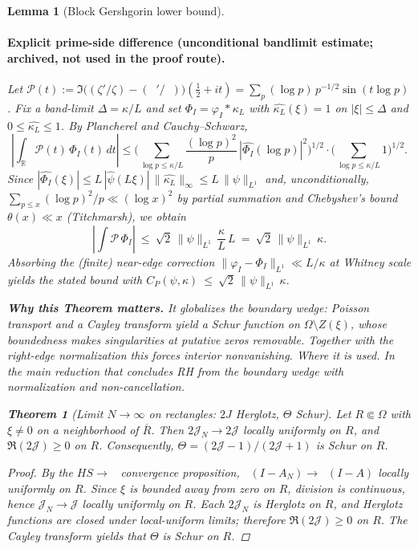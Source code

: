 \documentclass[11pt]{article}
\newtheorem{theorem}{Theorem}[section]
\newtheorem{lemma}{Lemma}[section]
\theoremstyle{definition}
\theoremstyle{remark}
\newcommand{\R}{\mathbb{R}}
\DeclareMathOperator{\dettwo}{det_2}
\begin{document}
\begin{lemma}[Block Gershgorin lower bound]
\vspace{1.0cm}
\paragraph{Explicit prime-side difference (unconditional bandlimit estimate; archived, not used in the proof route).}
Let $\mathcal P(t):=\Im\big((\zeta'/\zeta)-(\dettwo'/\dettwo)\big)(\tfrac12+it)=\sum_{p}(\log p)\,p^{-1/2}\sin(t\log p)$. Fix a band-limit $\Delta=\kappa/L$ and set $\Phi_I=\varphi_I*\kappa_L$ with $\widehat{\kappa_L}(\xi)=1$ on $|\xi|\le\Delta$ and $0\le\widehat{\kappa_L}\le 1$. By Plancherel and Cauchy–Schwarz,
\[
 \left|\int_\R \!\mathcal P(t)\,\Phi_I(t)\,dt\right|
 \le \Bigg(\sum_{\log p\le \kappa/L}\frac{(\log p)^2}{p}\,|\widehat{\Phi_I}(\log p)|^2\Bigg)^{\!1/2}
 \cdot\Bigg(\sum_{\log p\le \kappa/L}1\Bigg)^{\!1/2}.
\]
Since $|\widehat{\Phi_I}(\xi)|\le L\,|\widehat{\psi}(L\xi)|\,\|\widehat{\kappa_L}\|_\infty\le L\,\|\psi\|_{L^1}$ and, unconditionally, $\sum_{p\le x}(\log p)^2/p\ll (\log x)^2$ by partial summation and Chebyshev's bound $\theta(x)\ll x$ (Titchmarsh), we obtain
\[
 \left|\int \!\mathcal P\,\Phi_I\right|\ \le\ \sqrt{2}\,\|\psi\|_{L^1}\,\frac{\kappa}{L}\,L\ =\ \sqrt{2}\,\|\psi\|_{L^1}\,\kappa.
\]
Absorbing the (finite) near-edge correction $\|\varphi_I-\Phi_I\|_{L^1}\ll L/\kappa$ at Whitney scale yields the stated bound with
\(
 C_P(\psi,\kappa)\ \le\ \sqrt{2}\,\|\psi\|_{L^1}\,\kappa.
 \)



 

\vspace{1.0cm}
\noindent\textbf{Why this Theorem matters.} It globalizes the boundary wedge: Poisson transport and a Cayley transform yield a Schur function on $\Omega\setminus Z(\xi)$, whose boundedness makes singularities at putative zeros removable. Together with the right-edge normalization this forces interior nonvanishing.
\noindent\textit{Where it is used.} In the main reduction that concludes RH from the boundary wedge with normalization and non-cancellation.
\begin{theorem}[Limit \(N\to\infty\) on rectangles: \(2J\) Herglotz, \(\Theta\) Schur]\label{thm:limit-rect}
Let \(R\Subset\Omega\) with \(\xi\neq 0\) on a neighborhood of \(\overline R\). Then \(2\mathcal J_N\to 2\mathcal J\) locally uniformly on \(R\), and \(\Re(2\mathcal J)\ge 0\) on \(R\). Consequently, \(\Theta=(2\mathcal J-1)/(2\mathcal J+1)\) is Schur on \(R\).
\end{theorem}
\begin{proof}
By the \(HS\to\dettwo\) convergence proposition, $\dettwo(I-A_N)\to \dettwo(I-A)$ locally uniformly on $R$. Since $\xi$ is bounded away from zero on $R$, division is continuous, hence $\mathcal J_N\to \mathcal J$ locally uniformly on $R$. Each $2\mathcal J_N$ is Herglotz on $R$, and Herglotz functions are closed under local-uniform limits; therefore $\Re(2\mathcal J)\ge 0$ on $R$. The Cayley transform yields that $\Theta$ is Schur on $R$.


\end{proof}
\end{lemma}
\end{document}
